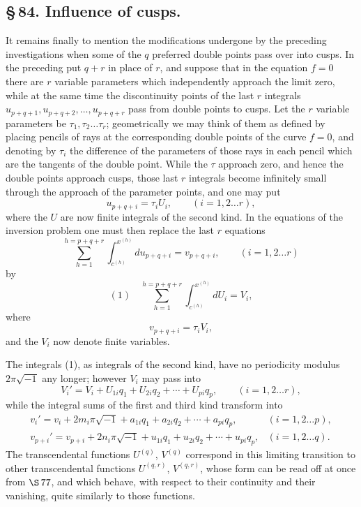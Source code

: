\documentclass[10pt]{article}
\begin{document}
\subsection*{\S\,84. Influence of cusps.}

It remains finally to mention the modifications undergone by the preceding investigations when some of the \(q\) preferred double points pass over into cusps. In the preceding put \(q+r\) in place of \(r\), and suppose that in the equation \(f=0\) there are \(r\) variable parameters which independently approach the limit zero, while at the same time the discontinuity points of the last \(r\) integrals \(u_{p+q+1},u_{p+q+2},\ldots,u_{p+q+r}\) pass from double points to cusps. Let the \(r\) variable parameters be \(\tau_1,\tau_2\ldots\tau_r\); geometrically we may think of them as defined by placing pencils of rays at the corresponding double points of the curve \(f=0\), and denoting by \(\tau_i\) the difference of the parameters of those rays in each pencil which are the tangents of the double point. While the \(\tau\) approach zero, and hence the double points approach cusps, those last \(r\) integrals become infinitely small through the approach of the parameter points, and one may put
\[
u_{p+q+i}=\tau_iU_i,
\qquad (i=1,2\ldots r),
\]
where the \(U\) are now finite integrals of the second kind. In the equations of the inversion problem one must then replace the last \(r\) equations
\[
\sum_{h=1}^{h=p+q+r}\int_{c^{(h)}}^{x^{(h)}}du_{p+q+i}=v_{p+q+i},
\qquad (i=1,2\ldots r)
\]
by
\[
(1)\quad \sum_{h=1}^{h=p+q+r}\int_{c^{(h)}}^{x^{(h)}}dU_i=V_i,
\]
where
\[
v_{p+q+i}=\tau_iV_i,
\]
and the \(V_i\) now denote finite variables.

The integrals (1), as integrals of the second kind, have no periodicity modulus \(2\pi\sqrt{-1}\) any longer; however \(V_i\) may pass into
\[
V_i'=V_i+U_{1i}q_1+U_{2i}q_2+\cdots+U_{pi}q_p,
\qquad (i=1,2\ldots r),
\]
while the integral sums of the first and third kind transform into
\[
\begin{array}{ll}
v_i'=v_i+2m_i\pi\sqrt{-1}+a_{1i}q_1+a_{2i}q_2+\cdots+a_{pi}q_p,&(i=1,2\ldots p),\\
v_{p+i}'=v_{p+i}+2n_i\pi\sqrt{-1}+u_{1i}q_1+u_{2i}q_2+\cdots+u_{pi}q_p,&(i=1,2\ldots q).
\end{array}
\]
The transcendental functions \(U^{(q)}\), \(V^{(q)}\) correspond in this limiting transition to other transcendental functions \(U^{(q,r)}\), \(V^{(q,r)}\), whose form can be read off at once from \(\S\,77\), and which behave, with respect to their continuity and their vanishing, quite similarly to those functions.
\end{document}
